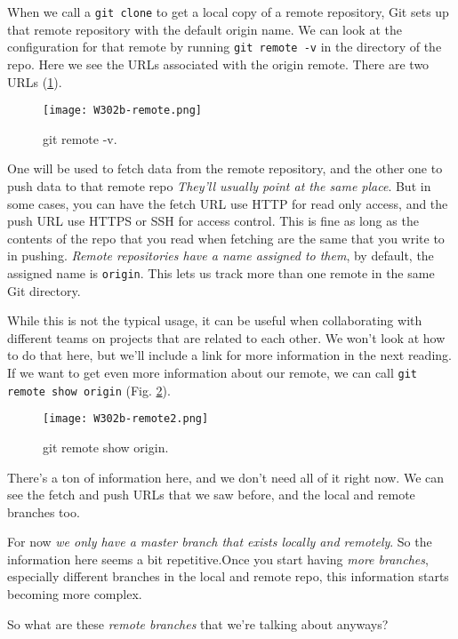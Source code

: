 When we call a \verb|git clone| to get a local copy of a remote repository, Git sets up that remote repository with the default origin name. We can look at the configuration for that remote by running \verb|git remote -v| in the directory of the repo. 
Here we see the URLs associated with the origin remote. There are two URLs (\ref{W302b-remote}). 

\begin{figure} 
	\caption{git remote -v.}
	\centering
	\texttt{[image: W302b-remote.png]}
	\label{W302b-remote}
\end{figure}

One will be used to fetch data from the remote repository, and the other one to push data to that remote repo
\textit{They'll usually point at the same place}. But in some cases, you can have the fetch URL use HTTP for read only access, and the push URL use HTTPS or SSH for access control. This is fine as long as the contents of the repo that you read when fetching are the same that you write to in pushing. \textit{Remote repositories have a name assigned to them}, by default, the assigned name is \verb|origin|. This lets us track more than one remote in the same Git directory.

While this is not the typical usage, it can be useful when collaborating with different teams on projects that are related to each other. We won't look at how to do that here, but we'll include a link for more information in the next reading. If we want to get even more information about our remote, we can call \verb|git remote show origin| (Fig. \ref{W302b-remote2}).

\begin{figure} 
	\caption{git remote show origin.}
	\centering
	\texttt{[image: W302b-remote2.png]}
	\label{W302b-remote2}
\end{figure}

There's a ton of information here, and we don't need all of it right now. We can see the fetch and push URLs that we saw before, and the local and remote branches too.

For now \textit{we only have a master branch that exists locally and remotely}. So the information here seems a bit repetitive.Once you start having\textit{ more branches}, especially different branches in the local and remote repo, this information starts becoming more complex.

So what are these \textit{remote branches} that we're talking about anyways?

